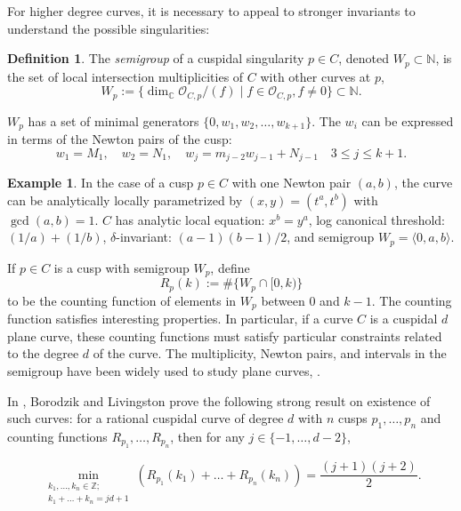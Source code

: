 \documentclass[JEP,XML,SOM,Unicode,NoFloatCountersInSection,published]{cedram}
\theoremstyle{plain}
\theoremstyle{definition}
\newtheorem{example}[theorem]{Example}
\newtheorem{definition}[theorem]{Definition}
\newcommand\CC{{\mathbb C}}
\newcommand\NN{{\mathbb N}}
\newcommand\ZZ{{\mathbb Z}}
\newcommand\Oc{{\mathcal O}}
\begin{document}
For higher degree curves, it is necessary to appeal to stronger invariants to understand the possible singularities:

\begin{definition}\label{defn:semigroup}
The \textit{semigroup} of a cuspidal singularity $p\in C$, denoted $W_p\subset \NN$, is the set of local intersection multiplicities of $C$ with other curves at $p$, \ie
\[
W_p:= \{ \dim_{\CC} \Oc_{C,p} /(f) \mid f \in \Oc_{C,p}, f \ne 0 \} \subset \NN.
\]
\end{definition}

$W_p$ has a set of minimal generators $\{0,w_1, w_2, \dots , w_{k+1} \}$. The $w_i$ can be expressed in terms of the Newton pairs of the cusp:
\[
w_1 = M_1, \quad w_2 = N_1, \quad w_j = m_{j-2}w_{j-1} + N_{j-1} \quad 3 \le j \le k+1.
\]

\begin{example}
In the case of a cusp $p\in C$ with one Newton pair $(a,b)$, the curve can be analytically locally parametrized by $(x,y)=(t^a,t^b)$ with $\gcd(a,b)=1$. $C$ has analytic local equation: $x^b=y^a$, log canonical threshold: $(1/a)+(1/b)$, $\delta$-invariant: $(a-1)(b-1)/2$, and semigroup $W_p=\langle 0,a,b\rangle$.
\end{example}

If $p\in C$ is a cusp with semigroup $W_p$, define
\[
R_p(k) := \#\{ W_p \cap [0,k) \}
\]
to be the counting function of elements in $W_p$ between $0$ and $k-1$. The counting function satisfies interesting properties. In particular, if a curve $C$ is a cuspidal $d$ plane curve, these counting functions must satisfy particular constraints related to the degree $d$ of the curve. The multiplicity, Newton pairs, and intervals in the semigroup have been widely used to study plane curves, \eg \cite{MatsuokaSakai,Orevkov,Unicuspidalcurves,BorLiv}.

In \cite[Th.\,6.5, Rem.\,6.6]{BorLiv}, Borodzik and Livingston prove the following strong result on existence of such curves: for a rational cuspidal curve of degree $d$ with $n$ cusps $p_1, \dots, p_n$ and counting functions $R_{p_1}, \dots, R_{p_n}$, then for any $j \in \{ -1, \dots, d-2\}$,

\begin{equation}\label{countingfunction}
\min_{\substack{k_1, \dots, k_n \in \ZZ; \\ k_1 + \dots + k_n = jd + 1}} ( R_{p_1}(k_1) + \dots + R_{p_n}(k_n)) = \frac{(j+1)(j+2)}{2}.
\end{equation}
\end{document}
